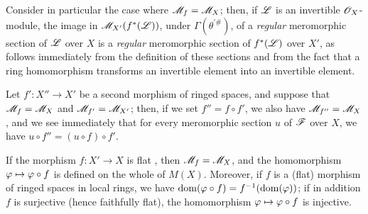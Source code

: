 \begin{env}[20.1.11]
Consider in particular the case where $\mathscr{M}_f=\mathscr{M}_X$; then, if $\mathscr{L}$ is an invertible $\mathscr{O}_X$-module, the image in $\mathscr{M}_{X'}(f^*(\mathscr{L}))$, under $\Gamma(\theta^{\prime\#})$, of a \emph{regular} meromorphic section of $\mathscr{L}$ over $X$  is a \emph{regular} meromorphic section of $f^*(\mathscr{L})$ over $X'$, as follows immediately from the definition of these sections and from the fact that a ring homomorphism transforms an invertible element into an invertible element.

Let $f':X''\to X'$ be a second morphism of ringed spaces, and suppose that $\mathscr{M}_f=\mathscr{M}_X$ and $\mathscr{M}_{f'}=\mathscr{M}_{X'}$; then, if we set $f''=f\circ f'$, we also have $\mathscr{M}_{f''}=\mathscr{M}_X$, and we see immediately that for every meromorphic section $u$ of $\mathscr{F}$ over $X$, we have $u\circ f''=(u\circ f)\circ f'$.
\end{env}

\begin{proposition}[20.1.12]
\label{IV.20.1.12}
If the morphism $f:X'\to X$ is flat , then $\mathscr{M}_f=\mathscr{M}_X$, and the homomorphism $\varphi\mapsto\varphi\circ f$ is defined on the whole of $M(X)$.
Moreover, if $f$ is a (flat) morphism of ringed spaces in local rings, we have $\operatorname{dom}(\varphi\circ f)=f^{-1}(\operatorname{dom}(\varphi))$; if in addition $f$ is surjective (hence faithfully flat), the homomorphism $\varphi\mapsto\varphi\circ f$ is injective.
\end{proposition}

